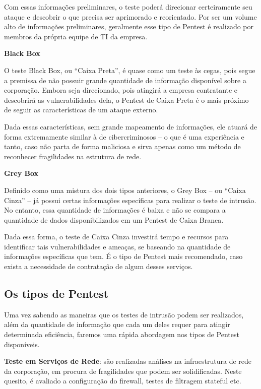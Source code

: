 Com essas informações preliminares, o teste poderá direcionar certeiramente seu ataque e descobrir o que precisa ser aprimorado e reorientado. Por ser um volume alto de informações preliminares, geralmente esse tipo de Pentest é realizado por membros da própria equipe de TI da empresa.

\textbf{Black Box}

O teste Black Box, ou “Caixa Preta”, é quase como um teste às cegas, pois segue a premissa de não possuir grande quantidade de informação disponível sobre a corporação. Embora seja direcionado, pois atingirá a empresa contratante e descobrirá as vulnerabilidades dela, o Pentest de Caixa Preta é o mais próximo de seguir as características de um ataque externo.

Dada essas características, sem grande mapeamento de informações, ele atuará de forma extremamente similar à de cibercriminosos – o que é uma experiência e tanto, caso não parta de forma maliciosa e sirva apenas como um método de reconhecer fragilidades na estrutura de rede.

\textbf{Grey Box}

Definido como uma mistura dos dois tipos anteriores, o Grey Box – ou “Caixa Cinza” – já possui certas informações específicas para realizar o teste de intrusão. No entanto, essa quantidade de informações é baixa e não se compara a quantidade de dados disponibilizados em um Pentest de Caixa Branca.

Dada essa forma, o teste de Caixa Cinza investirá tempo e recursos para identificar tais vulnerabilidades e ameaças, se baseando na quantidade de informações específicas que tem. É o tipo de Pentest mais recomendado, caso exista a necessidade de contratação de algum desses serviços.

\subsection{Os tipos de Pentest}

Uma vez sabendo as maneiras que os testes de intrusão podem ser realizados, além da quantidade de informação que cada um deles requer para atingir determinada eficiência, faremos uma rápida abordagem nos tipos de Pentest disponíveis.

\textbf{Teste em Serviços de Rede}: são realizadas análises na infraestrutura de rede da corporação, em procura de fragilidades que podem ser solidificadas. Neste quesito, é avaliado a configuração do firewall, testes de filtragem stateful etc.

